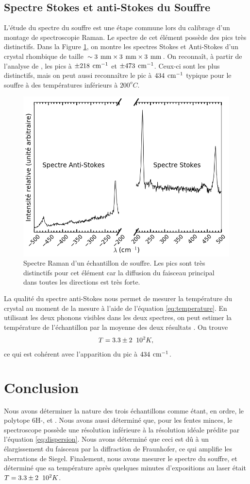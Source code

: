 \documentclass[10pt,letterpaper,twocolumn]{article}
\newcommand{\s}{\hspace{0.1cm}}
\newcommand{\unit}[1]{\hspace{0.15cm}\text{#1}}
\begin{document}
\subsection{Spectre Stokes et anti-Stokes du Souffre}
L'étude du spectre du souffre est une étape commune lors du calibrage d'un montage de spectroscopie Raman. Le spectre de cet élément possède des pics très distinctifs. Dans la Figure \ref{fig:sulfure}, on montre les spectres Stokes et Anti-Stokes d'un crystal rhombique de taille $\sim 3\unit{mm}\times3\unit{mm}\times 3\unit{mm}$. On reconnaît, à partir de l'analyse de \citeauthor{Ward1968}\supercite{Ward1968}, les pics à $\pm218\unit{cm}^{-1}$ et $\pm473\unit{cm}^{-1}$. Ceux-ci sont les plus distinctifs, mais on peut aussi reconnaître le pic à $434\unit{cm}^{-1}$ typique pour le souffre à des températures inférieurs à $200^oC$\supercite{Ward1968}. 
\begin{figure}[H]
	\centering
	\includegraphics[width=0.8\linewidth]{figures/sulfure.png}
	\caption{Spectre Raman d'un échantillon de souffre. Les pics sont très distinctifs pour cet élément car la diffusion du faisceau principal dans toutes les directions est très forte. }
	\label{fig:sulfure}
\end{figure}
La qualité du spectre anti-Stokes nous permet de mesurer la température du crystal au moment de la mesure à l'aide de l'équation \ref{eq:temperature}. En utilisant les deux phonons visibles dans les deux spectres, on peut estimer la température de l'échantillon par la moyenne des deux résultats . On trouve $$T = 3.3 \pm 2\s\s 10^2K, $$ ce qui est cohérent avec l'apparition du pic à $434\unit{cm}^{-1}$. 


\section{Conclusion}\label{sec:conclusion} %
Nous avons déterminer la nature des trois échantillons comme étant, en ordre, le polytope 6H-,  et . Nous avons aussi déterminé que, pour les fentes minces, le spectroscope possède une résolution inférieure à la résolution idéale prédite par l'équation \ref{eq:dispersion}. Nous avons déterminé que ceci est dû à un élargissement du faisceau par la diffraction de Fraunhofer, ce qui amplifie les aberrations de Siegel. Finalement, nous avons mesurer le spectre du souffre, et déterminé que sa température après quelques minutes d'expositions au laser était $T = 3.3 \pm 2\s\s 10^2K$. 

\printbibliography
\end{document}
